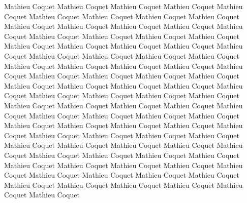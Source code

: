 Mathieu Coquet Mathieu Coquet Mathieu Coquet Mathieu Coquet Mathieu Coquet Mathieu Coquet Mathieu Coquet Mathieu Coquet Mathieu Coquet Mathieu Coquet Mathieu Coquet Mathieu Coquet Mathieu Coquet Mathieu Coquet Mathieu Coquet Mathieu Coquet Mathieu Coquet Mathieu Coquet Mathieu Coquet Mathieu Coquet Mathieu Coquet Mathieu Coquet Mathieu Coquet Mathieu Coquet Mathieu Coquet Mathieu Coquet Mathieu Coquet Mathieu Coquet Mathieu Coquet Mathieu Coquet Mathieu Coquet Mathieu Coquet Mathieu Coquet Mathieu Coquet Mathieu Coquet Mathieu Coquet Mathieu Coquet Mathieu Coquet Mathieu Coquet Mathieu Coquet Mathieu Coquet Mathieu Coquet Mathieu Coquet Mathieu Coquet Mathieu Coquet Mathieu Coquet Mathieu Coquet Mathieu Coquet Mathieu Coquet Mathieu Coquet Mathieu Coquet Mathieu Coquet Mathieu Coquet Mathieu Coquet Mathieu Coquet Mathieu Coquet Mathieu Coquet Mathieu Coquet Mathieu Coquet Mathieu Coquet Mathieu Coquet Mathieu Coquet Mathieu Coquet Mathieu Coquet Mathieu Coquet Mathieu Coquet Mathieu Coquet Mathieu Coquet Mathieu Coquet Mathieu Coquet Mathieu Coquet Mathieu Coquet Mathieu Coquet Mathieu Coquet Mathieu Coquet Mathieu Coquet Mathieu Coquet Mathieu Coquet Mathieu Coquet Mathieu Coquet Mathieu Coquet Mathieu Coquet Mathieu Coquet Mathieu Coquet Mathieu Coquet Mathieu Coquet Mathieu Coquet 
